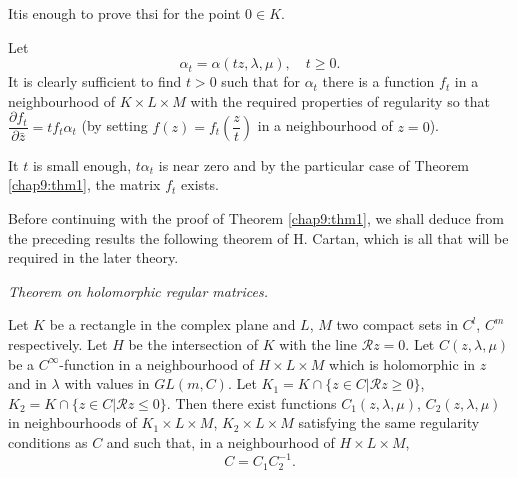 \medskip
{} It\pageoriginale is enough
to prove thsi for the point $0 \in K$. 

Let
$$
\alpha_t = \alpha (tz, \lambda, \mu), \quad t \geq 0.
$$
It is clearly sufficient to find $t>0$ such that for $\alpha_t$ there
is a function $f_t$ in a neighbourhood of $K \times L \times M$ with
the required properties of regularity so that $\dfrac{\partial
  f_t}{\partial \bar{z}} = tf_t \alpha_t$ (by setting $f(z) = f_t
\left( \dfrac{z}{t} \right)$ in a neighbourhood of $z=0$).

It $t$ is small enough, $t \alpha_t$ is near zero and by the
particular case of Theorem \ref{chap9:thm1}, the matrix $f_t$ exists.

Before continuing with the proof of Theorem \ref{chap9:thm1}, we shall deduce from
the preceding results the following theorem of H. Cartan, which is all
that will be required in the later theory. 

\medskip
{}
\textit{Theorem on holomorphic regular matrices.}

\begin{thm}\label{chap9:thm2}
Let $K$ be a rectangle in the complex plane and $L$, $M$ two compact
sets in $C^l$, $C^m$ respectively. Let $H$ be the intersection of $K$
with the line $\mathscr{R} z =0$. Let $C(z, \lambda, \mu)$ be a
$C^\infty$-function in a neighbourhood of $H \times L \times M$ which
is holomorphic in $z$ and in $\lambda$ with values in $GL(m,C)$. Let
$K_1 = K \cap \{z \in C \big| \mathscr{R} z \geq 0\}$, $K_2 = K \cap
\{z \in C \big| \mathscr{R} z \leq 0\}$. Then there exist functions
$C_1 (z, \lambda, \mu)$, $C_2 (z, \lambda, \mu)$ in neighbourhoods of
$K_1 \times L \times M$, $K_2 \times L \times M$ satisfying the same
regularity conditions as $C$ and such that, in a neighbourhood of $H
\times L \times M$,
$$
C = C_1 C^{-1}_2. 
$$
\end{thm}

